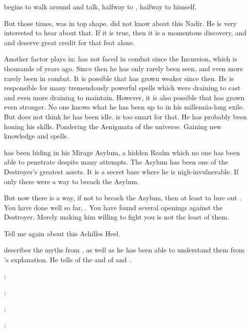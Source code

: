 \Azraid begins to walk around and talk, halfway to \Teshrial, halfway to himself.

But those times, \Ishnaruchaefir was in top shape. 
\Azraid did not know about this Nadir.
He is very interested to hear about that. 
If it is true, then it is a momentous discovery, and \Teshrial and \Urizeth deserve great credit for that feat alone. 

Another factor plays in:
\Azraid has not faced \Ishnaruchaefir in combat since the Incursion, which is thousands of years ago. 
Since then he has only rarely been seen, and even more rarely been in combat. 
It is possible that \Ishnaruchaefir has grown weaker since then.
He is responsible for many tremendously powerful spells which were draining to cast and even more draining to maintain. 
However, it is also possible that \Ishnaruchaefir has grown even stronger. 
No one knows what he has been up to in his millennia-long exile. 
But \Azraid does not think he has been idle.
\Ishnaruchaefir is too smart for that. 
He has probably been honing his skills. 
Pondering the Aenigmata of the universe.
Gaining new knowledge and spells. 

\Ishnaruchaefir has been hiding in his Mirage Asylum, a hidden Realm which no one has been able to penetrate despite many attempts. 
The Asylum has been one of the Destroyer's greatest assets. 
It is a secret base where he is nigh-invulnerable. 
If only there were a way to breach the Asylum. 

But now there is a way, if not to breach the Asylum, then at least to lure out \Ishnaruchaefir. 
You have done well so far, \Teshrial.
You have found several openings against the Destroyer. 
Merely making him willing to fight you is not the least of them. 

Tell me again about this Achilles Heel. 

\Teshrial describes the myths from \WanderersInDarknessEmph, as well as he has been able to understand them from \Urizeth's explanation.
He tells \Azraid of the \malgryph and of \Zaz and \Urzaz. 

\Teshrial: 

\Azraid: 

\Teshrial: 

\Azraid: 

